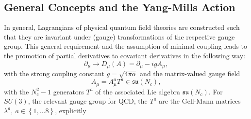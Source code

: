 \subsection{General Concepts and the Yang-Mills Action}
In general, Lagrangians of physical quantum field theories are constructed such that they are invariant under (gauge) transformations of the respective gauge group. This general requirement and the assumption of minimal coupling leads to the promotion of partial derivatives to covariant derivatives in the following way:
\begin{equation}
\partial_{\mu} \rightarrow D_{\mu}(A) = \partial_{\mu} - igA_{\mu},	\label{eqn:covariant_derivative}
\end{equation}
with the strong coupling constant $g=\sqrt{4\pi\alpha}$ and the matrix-valued gauge field
\begin{equation}
A_{\mu}=A_{\mu}^{a} T^{a} \in \mathfrak{su}(N_c), 
\end{equation}
with the $N_c^2-1$ generators $T^{a}$ of the associated Lie algebra $\mathfrak{su}(N_c)$. For $SU(3)$, the relevant gauge group for QCD,  the $T^{a}$ are the Gell-Mann matrices $\lambda^{a}, \ a\in\left\{1,\dots 8\right\}$, explicitly

